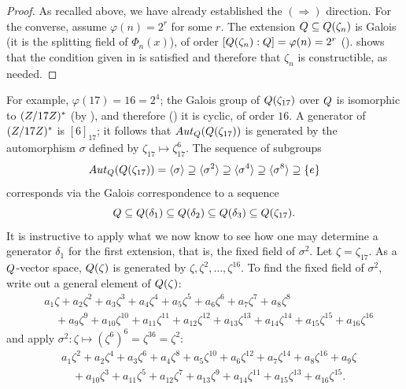 \begin{proof}
  As recalled above, we have already established the $(\Rightarrow)$
  direction. For the converse, assume $\varphi(n) = 2^r$ for some $r$.
  The extension $Q \subseteq Q(\zeta_n)$ is Galois (it is the
  splitting field of $\Phi_n(x)$), of order
  $[Q(\zeta_n) : Q] = \varphi(n) = 2^r$
  ().  shows that the
  condition given in  is satisfied and therefore
  that $\zeta_n$ is constructible, as needed.
\end{proof}
For example, $\varphi(17) = 16 = 2^4$; the Galois group of
$Q(\zeta_{17})$ over $Q$ is isomorphic to $(Z/17Z)^\ast$ (by
), and therefore () it
is cyclic, of order $16$. A generator of $(Z/17Z)^\ast$ is
$[6]_{17}$; it follows that $Aut_{Q}(Q(\zeta_{17}))$ is generated
by the automorphism $\sigma$ defined by
$\zeta_{17} \mapsto \zeta_{17}^6$. The sequence of subgroups
\[
  Aut_{Q}(Q(\zeta_{17})) = \langle\sigma\rangle \supseteq
  \langle\sigma^2\rangle \supseteq \langle\sigma^4\rangle \supseteq
  \langle\sigma^8\rangle \supseteq \{e\}
\]
corresponds via the Galois correspondence to a sequence
\[
  Q \subseteq Q(\delta_1) \subseteq Q(\delta_2) \subseteq
  Q(\delta_3) \subseteq Q(\zeta_{17}).
\]
It is instructive to apply what we now know to see how one may
determine a generator $\delta_1$ for the first extension, that is, the
fixed field of $\sigma^2$. Let $\zeta = \zeta_{17}$. As a $Q$-vector
space, $Q(\zeta)$ is generated by
$\zeta, \zeta^2, \dots, \zeta^{16}$. To find the fixed field of
$\sigma^2$, write out a general element of $Q(\zeta)$:
\begin{align*}
  &a_1\zeta + a_2\zeta^2 + a_3\zeta^3 + a_4\zeta^4 + a_5\zeta^5
    + a_6\zeta^6 + a_7\zeta^7 + a_8\zeta^8 \\
  &\quad + a_9\zeta^9 + a_{10}\zeta^{10} + a_{11}\zeta^{11}
    + a_{12}\zeta^{12} + a_{13}\zeta^{13} + a_{14}\zeta^{14}
    + a_{15}\zeta^{15} + a_{16}\zeta^{16}
\end{align*}
and apply
$\sigma^2 : \zeta \mapsto (\zeta^6)^6 = \zeta^{36} = \zeta^2$:
\begin{align*}
  &a_1\zeta^2 + a_2\zeta^4 + a_3\zeta^6 + a_4\zeta^8 + a_5\zeta^{10}
    + a_6\zeta^{12} + a_7\zeta^{14} + a_8\zeta^{16} + a_9\zeta \\
  &\quad + a_{10}\zeta^3 + a_{11}\zeta^5 + a_{12}\zeta^7
    + a_{13}\zeta^9 + a_{14}\zeta^{11} + a_{15}\zeta^{13}
    + a_{16}\zeta^{15}.
\end{align*}
